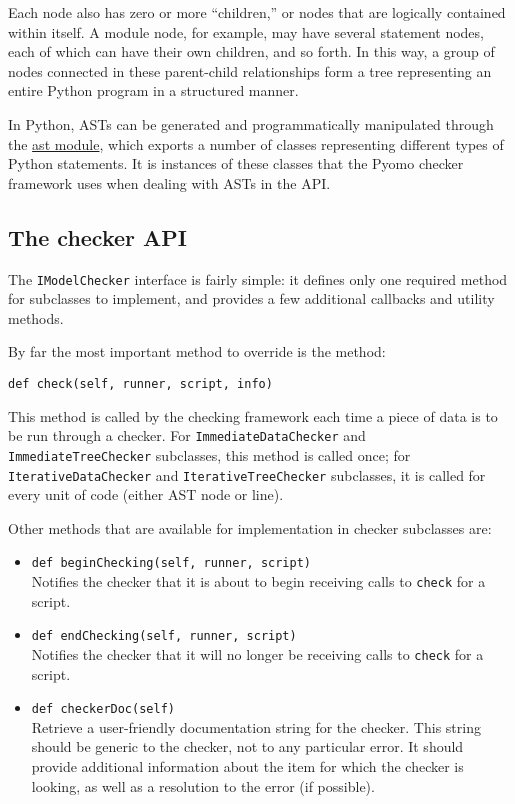 \documentclass{article}
\begin{document}
Each node also has zero or more ``children,'' or nodes that are logically contained within itself. A module node, for example, may have several statement nodes, each of which can have their own children, and so forth. In this way, a group of nodes connected in these parent-child relationships form a tree representing an entire Python program in a structured manner.

In Python, ASTs can be generated and programmatically manipulated through the \href{http://docs.python.org/library/ast.html}{ast module}, which exports a number of classes representing different types of Python statements. It is instances of these classes that the Pyomo checker framework uses when dealing with ASTs in the API.

\subsection*{The checker API}
The \verb!IModelChecker! interface is fairly simple: it defines only one required method for subclasses to implement, and provides a few additional callbacks and utility methods.

By far the most important method to override is the method:

\begin{verbatim}
def check(self, runner, script, info)
\end{verbatim}

This method is called by the checking framework each time a piece of data is to be run through a checker. For \verb!ImmediateDataChecker! and \verb!ImmediateTreeChecker! subclasses, this method is called once; for \verb!IterativeDataChecker! and \verb!IterativeTreeChecker! subclasses, it is called for every unit of code (either AST node or line).

Other methods that are available for implementation in checker subclasses are:

\begin{itemize}
\item \verb!def beginChecking(self, runner, script)! \\
Notifies the checker that it is about to begin receiving calls to \verb!check! for a script.
\item \verb!def endChecking(self, runner, script)! \\
Notifies the checker that it will no longer be receiving calls to \verb!check! for a script.
\item \verb!def checkerDoc(self)! \\
Retrieve a user-friendly documentation string for the checker. This string should be generic to the checker, not to any particular error. It should provide additional information about the item for which the checker is looking, as well as a resolution to the error (if possible).
\end{itemize}
\end{document}
